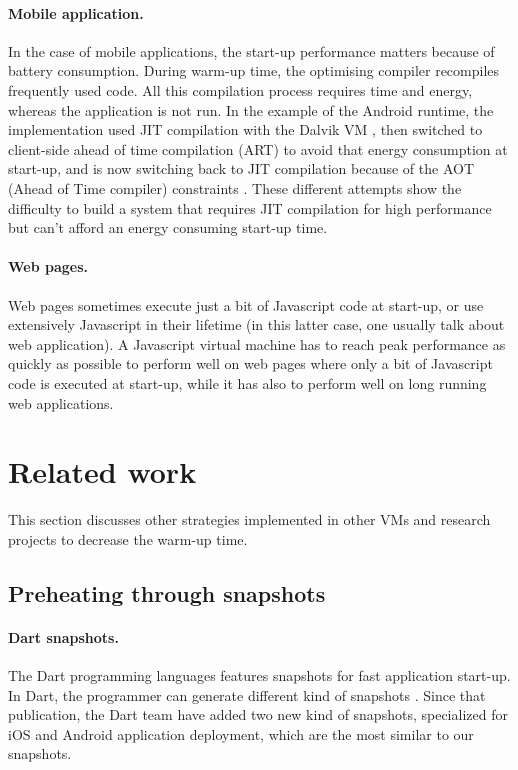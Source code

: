 \documentclass[a4paper,12pt,twoside]{../includes/ThesisStyle}
\begin{document}
\paragraph{Mobile application.}
In the case of mobile applications, the start-up performance matters because of battery consumption. During warm-up time, the optimising compiler recompiles frequently used code. All this compilation process requires time and energy, whereas the application is not run. In the example of the Android runtime, the implementation used JIT compilation with the Dalvik VM \cite{Born08a}, then switched to client-side ahead of time compilation (ART) to avoid that energy consumption at start-up, and is now switching back to JIT compilation because of the AOT (Ahead of Time compiler) constraints \cite{Geof15a}. These different attempts show the difficulty to build a system that requires JIT compilation for high performance but can't afford an energy consuming start-up time.

\paragraph{Web pages.}
Web pages sometimes execute just a bit of Javascript code at start-up, or use extensively Javascript in their lifetime (in this latter case, one usually talk about web application). A Javascript virtual machine has to reach peak performance as quickly as possible to perform well on web pages where only a bit of Javascript code is executed at start-up, while it has also to perform well on long running web applications.

\section{Related work}
\label{sec:relWork}

This section discusses other strategies implemented in other VMs and research projects to decrease the warm-up time.

\subsection{Preheating through snapshots}

\paragraph{Dart snapshots.}

The Dart programming languages features snapshots for fast application start-up. In Dart, the programmer can generate different kind of snapshots \cite{Anna13a}. Since that publication, the Dart team have added two new kind of snapshots, specialized for iOS and Android application deployment, which are the most similar to our snapshots.
\end{document}
